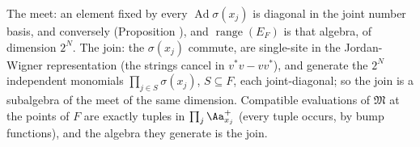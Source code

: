 The meet: an element fixed by every $\operatorname{Ad}\sigma(x_j)$ is diagonal in the joint number basis, and conversely (Proposition ), and $\operatorname{range}(E_F)$ is that algebra, of dimension $2^N$. The join: the $\sigma(x_j)$ commute, are single-site in the Jordan-Wigner representation (the strings cancel in $v^{*}v - vv^{*}$), and generate the $2^N$ independent monomials $\prod_{j \in S}\sigma(x_j)$, $S \subseteq F$, each joint-diagonal; so the join is a subalgebra of the meet of the same dimension. Compatible evaluations of $\mathfrak{M}$ at the points of $F$ are exactly tuples in $\prod_j \Aa_{x_j}^{+}$ (every tuple occurs, by bump functions), and the algebra they generate is the join.
